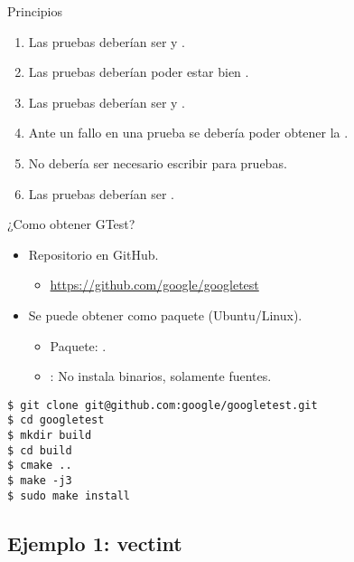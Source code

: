 \begin{frame}[t]{Principios}
\begin{enumerate}
  \item Las pruebas deberían ser  y .
  \item Las pruebas deberían poder estar bien .
  \item Las pruebas deberían ser  y .
  \item Ante un fallo en una prueba se debería poder obtener la .
  \item No debería ser necesario escribir  para pruebas.
  \item Las pruebas deberían ser .
\end{enumerate}
\end{frame}

\begin{frame}[t,fragile]{¿Como obtener GTest?}
\begin{itemize}
  \item Repositorio en GitHub.
    \begin{itemize}
      \item \url{https://github.com/google/googletest}
    \end{itemize}
  \vfill
  \item Se puede obtener como paquete (Ubuntu/Linux).
    \begin{itemize}
      \item Paquete: .
      \item {}: No instala binarios, solamente fuentes.
    \end{itemize}
\end{itemize}
\begin{lstlisting}[style=terminal]
$ git clone git@github.com:google/googletest.git
$ cd googletest
$ mkdir build
$ cd build
$ cmake ..
$ make -j3
$ sudo make install
\end{lstlisting}
\end{frame}

\subsection{Ejemplo 1: vectint}

